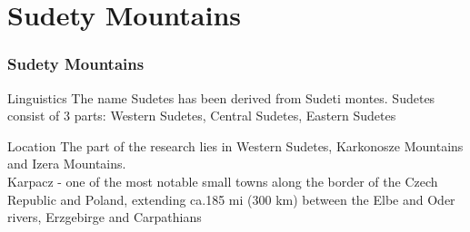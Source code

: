 \documentclass[pdflatex,compress,8pt,
	xcolor={dvipsnames,dvipsnames,svgnames,x11names,table},
	hyperref={colorlinks = true,
	breaklinks = true, urlcolor = NavyBlue, breaklinks = true}]{beamer}
\begin{document}
\section{Sudety Mountains}
\begin{frame}\frametitle{Sudety Mountains}
\vspace{2em}
\begin{alertblock}{Linguistics}
The name Sudetes has been derived from Sudeti montes.
Sudetes consist of 3 parts: Western Sudetes, Central Sudetes, Eastern Sudetes
\end{alertblock}

\begin{block}{Location}
The  part of the research lies in Western Sudetes, Karkonosze Mountains and Izera Mountains. \\
Karpacz - one of the most notable small towns along the border of the Czech Republic and Poland, extending ca.185 mi (300 km) between the Elbe and Oder rivers, Erzgebirge and Carpathians
\end{block}

\begin{figure}[H]
	\centering
			\hspace{5mm}
\end{figure}

\end{frame}
\end{document}
